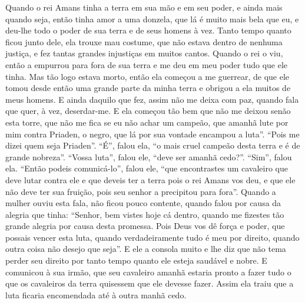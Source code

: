  Quando o rei Amans tinha a terra em sua mão e em seu poder, e ainda mais quando
seja, então tinha amor a uma donzela, que lá é muito mais bela que eu, e
deu-lhe todo o poder de sua terra e de seus homens à vez. Tanto tempo quanto
ficou junto dele, ela trouxe mau costume, que não estava dentro de nenhuma
justiça, e fez tantas grandes injustiças em muitos cantos. Quando o rei o viu,
então a empurrou para fora de sua terra e me deu em meu poder tudo que ele
tinha. Mas tão logo estava morto, então ela começou a me guerrear, de que ele
tomou desde então uma grande parte da minha terra e obrigou a ela muitos de
meus homens. E ainda daquilo que fez, assim não me deixa com paz, quando fala
que quer, à vez, deserdar-me. E ela começou tão bem que não me deixou senão
esta torre, que não me fica se eu não achar um campeão, que amanhã lute por mim
contra Priaden, o negro, que lá por sua vontade encampou a luta”. “Pois me
dizei quem seja Priaden”. “É”, falou ela, “o mais cruel campeão desta terra e é
de grande nobreza”. “Vossa luta”, falou ele, “deve ser amanhã cedo?”. “Sim”,
falou ela. “Então podeis comunicá-lo”, falou ele, “que encontrastes um
cavaleiro que deve lutar contra ele e que deveis ter a terra pois o rei Amans
vos deu, e que ele não deve ter sua fruição, pois seu senhor a precipitou para
fora”. Quando a mulher ouviu esta fala, não ficou pouco contente, quando falou
por causa da alegria que tinha: “Senhor, bem vistes hoje cá dentro, quando me
fizestes tão grande alegria por causa desta promessa. Pois Deus vos dê força e
poder, que possais vencer esta luta, quando verdadeiramente tudo é meu por
direito, quando outra coisa não desejo que seja”. E ele a consola muito e lhe
diz que não tema perder seu direito por tanto tempo quanto ele esteja saudável
e nobre. E comunicou à sua irmão, que seu cavaleiro amanhã estaria pronto a
fazer tudo o que os cavaleiros da terra quisessem que ele devesse fazer. Assim
ela traiu que a luta ficaria encomendada até à outra manhã cedo. 

